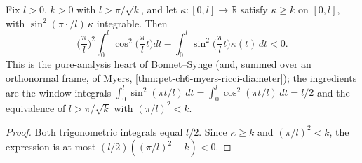 \begin{lemma}
  \label{lem:pet-ch6-bonnet-synge-index-core}
  \leanok
  Fix $l>0$, $k>0$ with $l>\pi/\sqrt k$, and let $\kappa:[0,l]\to\mathbb R$ satisfy
  $\kappa\ge k$ on $[0,l]$, with $\sin^2(\pi\cdot/l)\,\kappa$ integrable. Then
  \[
    \Big(\frac\pi l\Big)^2\int_0^l\cos^2\Big(\frac\pi lt\Big)dt
      -\int_0^l\sin^2\Big(\frac\pi lt\Big)\kappa(t)\,dt<0 .
  \]
  This is the pure-analysis heart of Bonnet--Synge (and, summed over an orthonormal frame,
  of Myers, \cref{thm:pet-ch6-myers-ricci-diameter}); the ingredients are the window
  integrals $\int_0^l\sin^2(\pi t/l)\,dt=\int_0^l\cos^2(\pi t/l)\,dt=l/2$ and the equivalence
  of $l>\pi/\sqrt k$ with $(\pi/l)^2<k$.
\end{lemma}
\begin{proof}
  \leanok
  \sketch
  Both trigonometric integrals equal \(l/2\). Since \(\kappa\ge k\) and \((\pi/l)^2<k\), the expression is at most \((l/2)((\pi/l)^2-k)<0\).
\end{proof}


